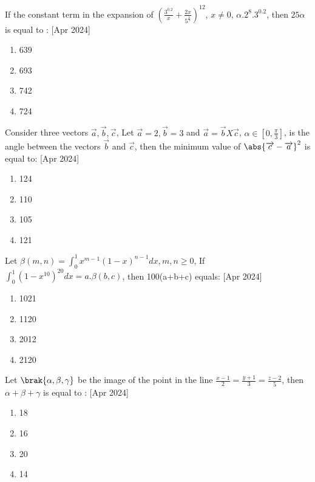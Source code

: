     \item If the constant term in the expansion of $(\frac{3^{0.2}}{x}+\frac{2x}{5^\frac{1}{3}})^{12}$, $x \neq 0$, $\alpha .2^{8}.3^{0.2}$, then $25\alpha$ is  equal to :
      \hfill{[Apr 2024]}
		\begin{multicols}{4}
			\begin{enumerate}
				\item 639
    \item 693
    \item 742
    \item 724
			\end{enumerate}
		\end{multicols}

    \item Consider three vectors $\overrightarrow{a},\overrightarrow{b},\overrightarrow{c}$, Let $\overrightarrow{a}=2,\overrightarrow{b}=3$ and $\overrightarrow{a}=\overrightarrow{b}X\overrightarrow{c}$, $\alpha \in [0,\frac{\pi}{3}]$, is the angle between the vectors $\overrightarrow{b}$ and $\overrightarrow{c}$, then the minimum value of $\abs{\overrightarrow{c}-\overrightarrow{a}}^2$ is equal to:
     \hfill{[Apr 2024]}
		\begin{multicols}{4}
			\begin{enumerate}
				
				\item 124
    \item 110
     \item 105
      \item 121
			\end{enumerate}
		\end{multicols}

    \item Let $\beta(m,n)=\int_{0}^{1} x^{m-1} (1-x)^{n-1}dx, m,n\geq0$, If $\int_{0}^{1} (1-x^10)^20 dx=a.\beta(b,c)$, then 100(a+b+c) equals:
      \hfill{[Apr 2024]}
    \begin{multicols}{4}
            \begin{enumerate}
              \item 1021
              \item 1120
              \item 2012
              \item 2120
            \end{enumerate}
        \end{multicols}
    \item Let $\brak{\alpha,\beta,\gamma}$ be the image of the point  in the line $\frac{x-1}{2}=\frac{y+1}{3}=\frac{z-2}{5}$, then $\alpha+\beta+\gamma$ is equal to : 
     \hfill{[Apr 2024]}
    \begin{multicols}{4}
            \begin{enumerate}
              \item 18
              \item  16
              \item  20
              \item 14 
              \end{enumerate}
        \end{multicols}

